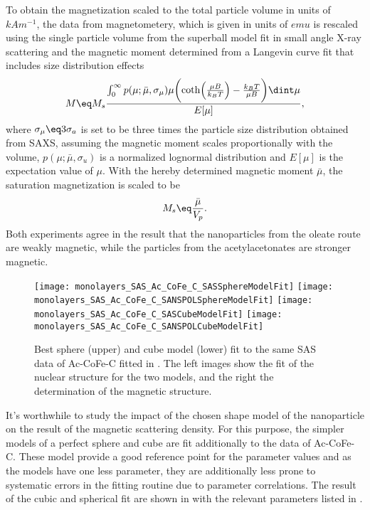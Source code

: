 \documentclass[\main/dresen_thesis.tex]{subfiles}
\begin{document}
    To obtain the magnetization scaled to the total particle volume in units of $\unit{kAm^{-1}}$, the data from magnetometery, which is given in units of $\unit{emu}$ is rescaled using the single particle volume from the superball model fit in small angle X-ray scattering and the magnetic moment determined from a Langevin curve fit that includes size distribution effects
    \begin{align}
      M \eq M_s
      \frac
      {\int_{0}^{\infty} p(\mu; \bar{\mu}, \sigma_\mu) \mu \biggl( \coth\Bigl(\frac{\mu B}{k_B T} \Bigr) - \frac{k_B T}{\mu B} \biggr) \dint \mu}
      {E[\mu]},
    \end{align}
    where $\sigma_\mu \eq 3 \sigma_a$ is set to be three times the particle size distribution obtained from SAXS, assuming the magnetic moment scales proportionally with the volume, $p(\mu; \bar{\mu}, \sigma_u)$ is a normalized lognormal distribution and $E[\mu]$ is the expectation value of $\mu$.
    With the hereby determined magnetic moment $\bar{\mu}$, the saturation magnetization is scaled to be
    \begin{align}
      M_s \eq \frac{\bar{\mu}}{V_p}.
    \end{align}
    Both experiments agree in the result that the nanoparticles from the oleate route are weakly magnetic, while the particles from the acetylacetonates are stronger magnetic.

    \begin{figure}[tb]
      \centering
      \texttt{[image: monolayers\_SAS\_Ac\_CoFe\_C\_SASSphereModelFit]}
      \texttt{[image: monolayers\_SAS\_Ac\_CoFe\_C\_SANSPOLSphereModelFit]}
      \texttt{[image: monolayers\_SAS\_Ac\_CoFe\_C\_SASCubeModelFit]}
      \texttt{[image: monolayers\_SAS\_Ac\_CoFe\_C\_SANSPOLCubeModelFit]}
      \caption{\label{fig:monolayers:nanoparticle:sas:SphereCubeFit}Best sphere (upper) and cube model (lower) fit to the same SAS data of Ac-CoFe-C fitted in . The left images show the fit of the nuclear structure for the two models, and the right the determination of the magnetic structure.}
    \end{figure}

    It's worthwhile to study the impact of the chosen shape model of the nanoparticle on the result of the magnetic scattering density.
    For this purpose, the simpler models of a perfect sphere and cube are fit additionally to the data of Ac-CoFe-C.
    These model provide a good reference point for the parameter values and as the models have one less parameter, they are additionally less prone to systematic errors in the fitting routine due to parameter correlations.
    The result of the cubic and spherical fit are shown in  with the relevant parameters listed in .
\end{document}
